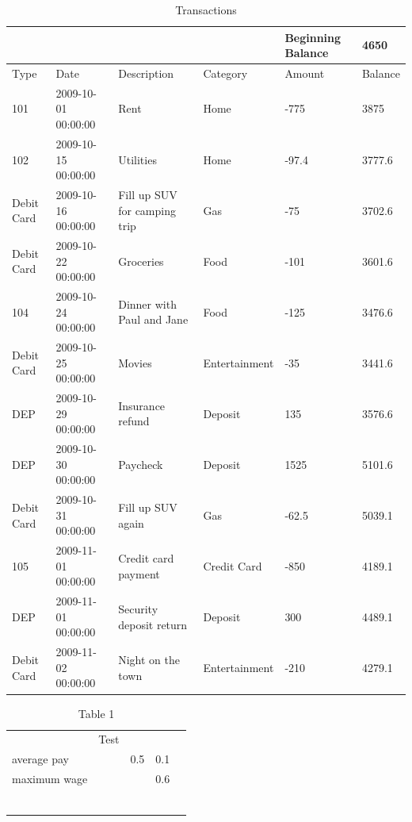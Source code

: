 \documentclass[11pt,a4paper]{article}
\begin{document}
\begin{table}[h]
\caption{Transactions}
\begin{tabular}{|l|l|l|l|l|l|}
\hline
 &  &  &  & Beginning Balance & 4650 \\ \hline
Type & Date & Description & Category & Amount & Balance \\ \hline
101 & 2009-10-01 00:00:00 & Rent & Home & -775 & 3875 \\ \hline
102 & 2009-10-15 00:00:00 & Utilities & Home & -97.4 & 3777.6 \\ \hline
Debit Card & 2009-10-16 00:00:00 & Fill up SUV for camping trip & Gas & -75 & 3702.6 \\ \hline
Debit Card & 2009-10-22 00:00:00 & Groceries & Food & -101 & 3601.6 \\ \hline
104 & 2009-10-24 00:00:00 & Dinner with Paul and Jane & Food & -125 & 3476.6 \\ \hline
Debit Card & 2009-10-25 00:00:00 & Movies & Entertainment & -35 & 3441.6 \\ \hline
DEP & 2009-10-29 00:00:00 & Insurance refund & Deposit & 135 & 3576.6 \\ \hline
DEP & 2009-10-30 00:00:00 & Paycheck & Deposit & 1525 & 5101.6 \\ \hline
Debit Card & 2009-10-31 00:00:00 & Fill up SUV again & Gas & -62.5 & 5039.1 \\ \hline
105 & 2009-11-01 00:00:00 & Credit card payment & Credit Card & -850 & 4189.1 \\ \hline
DEP & 2009-11-01 00:00:00 & Security deposit return & Deposit & 300 & 4489.1 \\ \hline
Debit Card & 2009-11-02 00:00:00 & Night on the town & Entertainment & -210 & 4279.1 \\ \hline
\end{tabular}
\end{table}

\begin{table}[h]
\caption{Table 1}
\begin{tabular}{|l|l|l|l|l|}
\hline
 &  &  &  &  \\ \hline
 & Test &  &  &  \\ \hline
average pay &  & 0.5 & 0.1 &  \\ \hline
maximum wage &  &  & 0.6 &  \\ \hline
 &  &  &  &  \\ \hline
 &  &  &  &  \\ \hline
 &  &  &  &  \\ \hline
 &  &  &  &  \\ \hline
 &  &  &  &  \\ \hline
 &  &  &  &  \\ \hline
\end{tabular}
\end{table}
\end{document}
